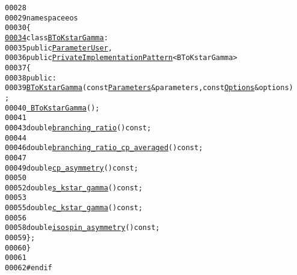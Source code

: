 \begin{footnotesize}
\begin{alltt}
00028 
00029 \textcolor{keyword}{namespace }eos
00030 \{
\hypertarget{exclusive-b-to-s-gamma_8hh_source_l00034}{}\hyperlink{classeos_1_1BToKstarGamma}{00034}     \textcolor{keyword}{class }\hyperlink{classeos_1_1BToKstarGamma}{BToKstarGamma} :
00035         \textcolor{keyword}{public} \hyperlink{classeos_1_1ParameterUser}{ParameterUser},
00036         \textcolor{keyword}{public} \hyperlink{classeos_1_1PrivateImplementationPattern}{PrivateImplementationPattern}<BToKstarGamma>
00037     \{
00038         \textcolor{keyword}{public}:
00039             \hyperlink{classeos_1_1BToKstarGamma_a8d9742896eb27084656a59b2a9ba4b3f}{BToKstarGamma}(\textcolor{keyword}{const} \hyperlink{classeos_1_1Parameters}{Parameters} & parameters, \textcolor{keyword}{const} \hyperlink{classeos_1_1Options}{Options} & options)
      ;
00040             \hyperlink{classeos_1_1BToKstarGamma_a9cb5e53e2bd12d0f3b87f02d0b780207}{~BToKstarGamma}();
00041 
00043             \textcolor{keywordtype}{double} \hyperlink{classeos_1_1BToKstarGamma_aeabd4759d56e4a1e6cd3f3df4b81fd1b}{branching_ratio}() \textcolor{keyword}{const};
00044 
00046             \textcolor{keywordtype}{double} \hyperlink{classeos_1_1BToKstarGamma_afc81c1b072b85980b3dea32b42f692fa}{branching_ratio_cp_averaged}() \textcolor{keyword}{const};
00047 
00049             \textcolor{keywordtype}{double} \hyperlink{classeos_1_1BToKstarGamma_aed1636a3d770081887c82800025bbda6}{cp_asymmetry}() \textcolor{keyword}{const};
00050 
00052             \textcolor{keywordtype}{double} \hyperlink{classeos_1_1BToKstarGamma_a36d453a167641d6f00c62d340fc4e81e}{s_kstar_gamma}() \textcolor{keyword}{const};
00053 
00055             \textcolor{keywordtype}{double} \hyperlink{classeos_1_1BToKstarGamma_a8b067c36cdcee5e3e48a261a9bb05895}{c_kstar_gamma}() \textcolor{keyword}{const};
00056 
00058             \textcolor{keywordtype}{double} \hyperlink{classeos_1_1BToKstarGamma_a85935a411404e5dd0b882b03dd000260}{isospin_asymmetry}() \textcolor{keyword}{const};
00059     \};
00060 \}
00061 
00062 \textcolor{preprocessor}{#endif}
\end{alltt}\end{footnotesize}
